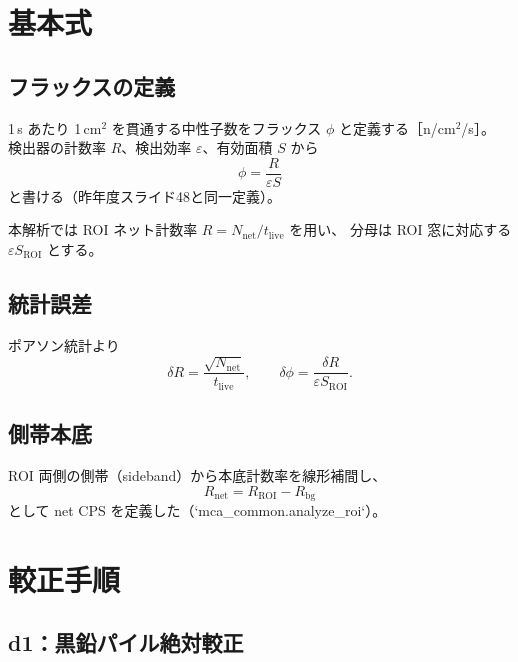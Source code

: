 \documentclass[a4paper,11pt]{ltjsarticle}
\begin{document}
\section{基本式}

\subsection{フラックスの定義}

1\,s あたり 1\,cm$^2$ を貫通する中性子数をフラックス $\phi$ と定義する［n/cm$^2$/s］。
検出器の計数率 $R$、検出効率 $\varepsilon$、有効面積 $S$ から
\begin{equation}
  \boxed{\phi = \frac{R}{\varepsilon S}}
  \label{eq:flux}
\end{equation}
と書ける（昨年度スライド48と同一定義）。

本解析では ROI ネット計数率 $R = N_\mathrm{net}/t_\mathrm{live}$ を用い、
分母は ROI 窓に対応する $\varepsilon S_\mathrm{ROI}$ とする。

\subsection{統計誤差}

ポアソン統計より
\begin{equation}
  \delta R = \frac{\sqrt{N_\mathrm{net}}}{t_\mathrm{live}}, \qquad
  \delta\phi = \frac{\delta R}{\varepsilon S_\mathrm{ROI}}.
\end{equation}

\subsection{側帯本底}

ROI 両側の側帯（sideband）から本底計数率を線形補間し、
\begin{equation}
  R_\mathrm{net} = R_\mathrm{ROI} - R_\mathrm{bg}
\end{equation}
として net CPS を定義した（`mca\_common.analyze\_roi`）。

\section{較正手順}

\subsection{d1：黒鉛パイル絶対較正}
\end{document}
